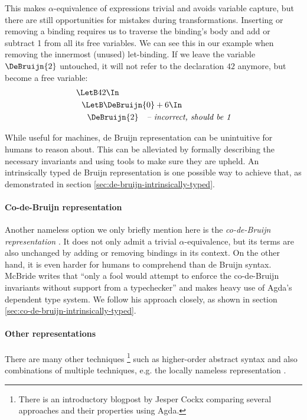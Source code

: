    This makes $\alpha$-equivalence of expressions trivial and avoids variable capture,
    but there are still opportunities for mistakes during transformations.
    Inserting or removing a binding
    requires us to traverse the binding's body and add or subtract 1 from all its free variables.
    We can see this in our example when removing the innermost (unused) let-binding.
    If we leave the variable $\DeBruijn{2}$ untouched,
    it will not refer to the declaration $42$ anymore,
    but become a free variable:
    \begin{align*}
      &\LetB 42 \In                   \\
      &\ \ \LetB \DeBruijn{0} + 6 \In \\
      &\ \ \ \ \DeBruijn{2}\ \ \ \textit{-- incorrect, should be 1}
    \end{align*}

    While useful for machines, de Bruijn representation can be unintuitive
    for humans to reason about.
    This can be alleviated by formally describing the necessary invariants
    and using tools to make sure they are upheld.
    An intrinsically typed de Bruijn representation is one
    possible way to achieve that, as demonstrated in section
    \ref{sec:de-bruijn-intrinsically-typed}.

  \paragraph{Co-de-Bruijn representation}
    Another nameless option we only briefly mention here is the
    \emph{co-de-Bruijn representation}
    \cite{McBride2018EveryBodysGotToBeSomewhere}.
    It does not only admit a trivial $\alpha$-equivalence,
    but its terms are also unchanged by adding or removing bindings
    in its context.
    On the other hand,
    it is even harder for humans to comprehend than de Bruijn syntax.
    McBride writes that
    ``only a fool would attempt to enforce the co-de-Bruijn invariants
    without support from a typechecker''
    and makes heavy use of Agda's dependent type system.
    We follow his approach closely, as shown in section
    \ref{sec:co-de-bruijn-intrinsically-typed}.

  \paragraph{Other representations}
    There are many other techniques%
    \footnote{
    There is an introductory blogpost by Jesper Cockx
    \cite{Cockx2021RepresentationsBinding}
    comparing several approaches and their properties using Agda.
    }
    such as higher-order abstract syntax
    \cite{Pfenning1988HOAS}
    and also combinations of multiple techniques, e.g. the locally nameless representation
    \cite{Chargueraud2011LocallyNameless}.
